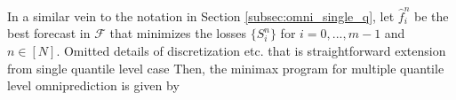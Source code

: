\documentclass{article}
\newcommand{\indi}[1]{\mathds{1}\{#1\}}
\newcommand{\cf}{\mathcal{F}}
\begin{document}





In a similar vein to the notation in Section \ref{subsec:omni_single_q}, let $\hat{f}_i^n$ be the best forecast in $\cf$ that minimizes the losses $\{S_i^n\}$ for $i =0,...,m\!-\!1$ and $n \in [N]$. {\color{blue} Omitted details of discretization etc. that is straightforward extension from single quantile level case} Then, the minimax program for multiple quantile level omniprediction is given by
\end{document}
